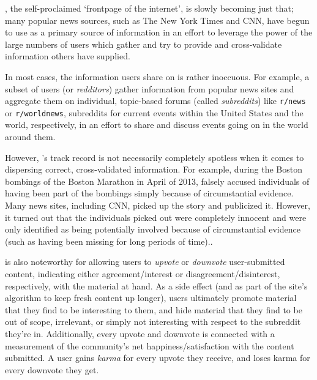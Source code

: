 \reddit{}, the self-proclaimed `frontpage of the internet', is slowly becoming
just that; many popular news sources, such as The New York Times and CNN, have
begun to use \reddit{} as a primary source of information in an effort to
leverage the power of the large numbers of users which gather and try to provide
and cross-validate information others have supplied.

In most cases, the information users share on \reddit{} is rather inoccuous. For
example, a subset of \reddit{} users (or \textit{redditors}) gather information
from popular news sites and aggregate them on individual, topic-based forums
(called \textit{subreddits}) like \texttt{r/news} or \texttt{r/worldnews},
subreddits for current events within the United States and the world,
respectively, in an effort to share and discuss events going on in the world
around them.

However, \reddit{}'s track record is not necessarily completely spotless when it
comes to dispersing correct, cross-validated information. For example, during
the Boston bombings of the Boston Marathon in April of 2013, \reddit{} falsely
accused individuals of having been part of the bombings simply because of
circumstantial evidence. Many news sites, including CNN, picked up the story and
publicized it. However, it turned out that the individuals \reddit{} picked out
were completely innocent and were only identified as being potentially involved
because of circumstantial evidence (such as having been missing for long periods
of time).\cite{Potts:2013:IRC:2507065.2507079}.

\reddit{} is also noteworthy for allowing users to \textit{upvote} or
\textit{downvote} user-submitted content, indicating either agreement/interest
or disagreement/disinterest, respectively, with the material at hand. As a side
effect (and as part of the site's algorithm to keep fresh content up longer),
users ultimately promote material that they find to be interesting to them, and
hide material that they find to be out of scope, irrelevant, or simply not
interesting with respect to the subreddit they're
in.\cite{Gilbert:2013:WUR:2441776.2441866} Additionally, every upvote and
downvote is connected with a measurement of the community's net
happiness/satisfaction with the content submitted. A user gains \textit{karma}
for every upvote they receive, and loses karma for every downvote they get.
